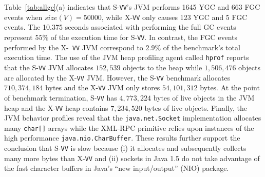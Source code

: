 \documentclass{sig-alternate}
\begin{document}
Table~\ref{tab:allgc}(a) indicates that S-{\tt VV}'s JVM performs 1645
YGC and 663 FGC events when $size(V)=50000$, while X-{\tt VV} only
causes 123 YGC and 5 FGC events.  The 10.375 seconds associated with
performing the full GC events represent $55\%$ of the execution time
for S-{\tt VV}.  In contrast, the FGC events performed by the X-{\tt
  VV} JVM correspond to $2.9\%$ of the benchmark's total execution
time.  The use of the JVM heap profiling agent called {\tt hprof}
reports that the S-{\tt VV} JVM allocates $152,539$ objects to the
heap while $1,506,476$ objects are allocated by the X-{\tt VV} JVM.
However, the S-{\tt VV} benchmark allocates $710,374,184$ bytes and
the X-{\tt VV} JVM only stores $54,101,312$ bytes.  At the point of
benchmark termination, S-{\tt VV} has $4,773,224$ bytes of live
objects in the JVM heap and the X-{\tt VV} heap contains $7,234,520$
bytes of live objects.  Finally, the JVM behavior profiles reveal that
the {\tt java.net.Socket} implementation allocates many {\tt char[]}
arrays while the XML-RPC primitive relies upon instances of the high
performance {\tt java.nio.CharBuffer}.  These results further support
the conclusion that S-{\tt VV} is slow because (i) it allocates and
subsequently collects many more bytes than X-{\tt VV} and (ii) sockets
in Java 1.5 do not take advantage of the fast character buffers in
Java's ``new input/output'' (NIO) package.
\end{document}
